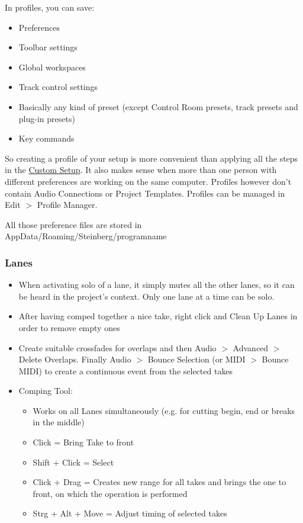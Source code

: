 \documentclass[10pt]{article}
\begin{document}
In profiles, you can save:
\begin{itemize}
	\item Preferences
	\item Toolbar settings
	\item Global workspaces
	\item Track control settings
	\item Basically any kind of preset (except Control Room presets, track presets and plug-in presets)
	\item Key commands
\end{itemize}
So creating a profile of your setup is more convenient than applying all the steps in the \hyperlink{CustomSetup}{Custom Setup}. It also makes sense when more than one person with different preferences are working on the same computer. Profiles however don't contain Audio Connections or Project Templates. Profiles can be managed in Edit $>$ Profile Manager.

All those preference files are stored in AppData/Roaming/Steinberg/programname

\subsubsection{Lanes}

\begin{itemize}
	\item When activating solo of a lane, it simply mutes all the other lanes, so it can be heard in the project's context. Only one lane at a time can be solo.
	\item After having comped together a nice take, right click and Clean Up Lanes in order to remove empty ones
	\item Create suitable crossfades for overlaps and then Audio $>$ Advanced $>$ Delete Overlaps. Finally Audio $>$ Bounce Selection (or MIDI $>$ Bounce MIDI) to create a continuous event from the selected takes
	\item Comping Tool:
	\begin{itemize}
		\item Works on all Lanes simultaneously (e.g. for cutting begin, end or breaks in the middle)
		\item Click = Bring Take to front
		\item Shift + Click = Select
		\item Click + Drag = Creates new range for all takes and brings the one to front, on which the operation is performed
		\item Strg + Alt + Move = Adjust timing of selected takes
	\end{itemize}
\end{itemize}
\end{document}
